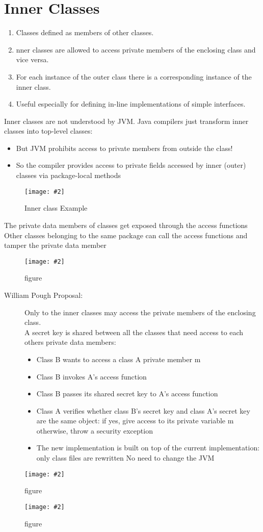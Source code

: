 \documentclass[a4paper,10pt]{scrreprt}
\newcommand{\pic}[2][figure]{\begin{figure}[h]
 \centering
 \texttt{[image: \#2]}
 \caption{#1}
\end{figure}
}
\begin{document}
\section{Inner Classes}
\begin{enumerate}
 \item Classes defined as members of other
classes.
\item nner classes are allowed to access
private members of the enclosing
class and vice versa.
\item For each instance of the outer class
there is a corresponding instance of
the inner class.
\item Useful especially for defining in-line
implementations of simple interfaces.
\end{enumerate}


 Inner classes are not understood by JVM.
 Java compilers just transform inner classes into top-level classes:
\begin{itemize}
 \item  But JVM prohibits access to private members from outside
the class!
\item So the compiler provides access to private fields accessed
by inner (outer) classes via package-local methods
\end{itemize}

\pic[Inner class Example]{classex.png}

\begin{framed}
 The private data members of classes get exposed through the
access functions
Other classes belonging to the same package can call the access
functions and tamper the private data member
\end{framed}
\pic{unacin.png}

\begin{framed}
 \begin{description}
  \item [William Pough Proposal:] Only to the inner classes may access the private
members of the enclosing class.\\
A secret key is shared between all the classes that need
access to each others private data members:
\begin{itemize}
\item Class B wants to access a class A private member m
\item Class B invokes A’s access function
\item Class B passes its shared secret key to A’s access function
\item Class A verifies whether class B’s secret key and class A’s secret
key are the same object:
\subitem if yes, give access to its private variable m
\subitem otherwise, throw a security exception
\item The new implementation is built on top of the current
implementation:
\subitem only class files are rewritten
\subitem No need to change the JVM
 
\end{itemize}

 \end{description}

\end{framed}
\pic{plid.png}
\pic{plimpl.png}
\end{document}

